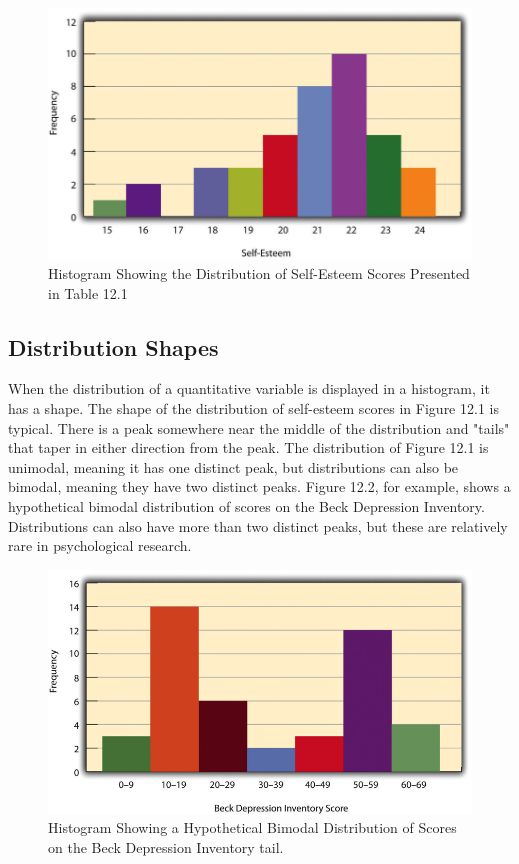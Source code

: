 \begin{figure}

\includegraphics[width=\linewidth]{figures/Fig121}

\caption{Histogram Showing the Distribution of Self-Esteem Scores Presented in Table 12.1}

\label{fig:hist}
\end{figure}

\subsection{Distribution Shapes}

When the distribution of a quantitative variable is displayed in a histogram, it has a shape. The shape of the distribution of self-esteem scores in Figure 12.1 is typical. There is a peak somewhere near the middle of the distribution and "tails" that taper in either direction from the peak. The distribution of Figure 12.1 is unimodal, meaning it has one distinct peak, but distributions can also be bimodal, meaning they have two distinct peaks. Figure 12.2, for example, shows a hypothetical bimodal distribution of scores on the Beck Depression Inventory. Distributions can also have more than two distinct peaks, but these are relatively rare in psychological research.


\begin{figure}

\includegraphics[width=\linewidth]{figures/Fig122}

\caption{Histogram Showing a Hypothetical Bimodal Distribution of Scores on the Beck Depression Inventory
tail. }

\label{fig:bimodal}

\end{figure}

